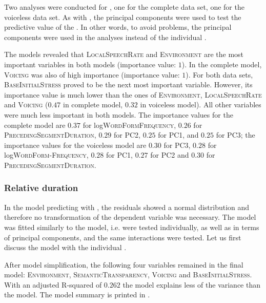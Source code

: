 Two  analyses were conducted for , one for the complete data set, one for the voiceless data set. As with , the principal components were used to test the predictive value of the . In other words, to avoid  problems, the principal components were used in the analyses instead of the individual . 

The models revealed that \textsc{LocalSpeechRate} and \textsc{Environment}  are the most important variables in both models (importance value: $1$). In the complete model, \textsc{Voicing} was also of high importance (importance value: $1$). 
For both data sets, \textsc{BaseInitialStress} proved to be the next most important variable. However, its importance value is much lower than the ones of \textsc{Environment}, \textsc{LocalSpeechRate} and \textsc{Voicing} ($0.47$ in complete model, $0.32$ in voiceless model).
 All other variables were much less important in both models. 
The importance values for the complete model are $0.37$ for log\textsc{WordFormFrequency},  $0.26$ for \textsc{PrecedingSegmentDuration}, $0.29$ for \textsc{PC2}, $0.25$ for \textsc{PC1},  and $0.25$ for \textsc{PC3}; 
 the importance values for the voiceless model are $0.30$ for \textsc{PC3}, $0.28$ for log\textsc{WordForm-Frequency}, $0.28$ for \textsc{PC1}, $0.27$ for \textsc{PC2} and $0.30$ for \textsc{PrecedingSegmentDuration}.



\subsubsection{Relative duration}

In the model predicting  with , the residuals showed a normal distribution and therefore no transformation of the dependent variable was necessary. The model was fitted similarly to the  model, i.e.  were tested individually, as well as in terms of principal components, and the same interactions were tested. Let us first discuss the model with the individual .

After model simplification, the following four variables remained in the final model: \textsc{Environment}, \textsc{SemanticTransparency}, \textsc{Voicing} and \textsc{BaseInitialStress}. With an adjusted R-squared of $0.262$ the model explains less of the variance than the  model. The model summary is printed in .
  
